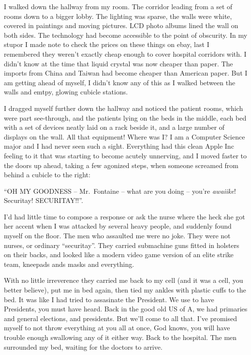 I walked down the hallway from my room. The corridor leading from a set of rooms down to a bigger lobby. The lighting was sparse, the walls were white, covered in paintings and moving pictures. LCD photo albums lined the wall on both sides. The technology had become accessible to the point of obscurity.
In my stupor I made note to check the prices on these things on ebay, last I remembered they weren't exactly cheap enough to cover hospital corridors with. I didn't know at the time that liquid crystal was now cheaper than paper. The imports from China and Taiwan had become cheaper than American paper. But I am getting ahead of myself, I didn't know any of this as I walked between the walls and emtpy, glowing cubicle stations.

I dragged myself further down the hallway and noticed the patient rooms, which were part see-through, and the patients lying on the beds in the middle, each bed with a set of devices neatly laid on a rack beside it, and a large number of displays on the wall. All that equipment! Where was I? I am a Computer Science major and I had never seen such a sight. Everything had this clean Apple Inc feeling to it that was starting to become acutely unnerving, and I moved faster to the doors up ahead, taking a few agonized steps, when someone screamed from behind a cubicle to the right:

``OH MY GOODNESS -- Mr.~Fontaine -- what are you doing -- you're \textit{awaiike}! Securitay! SECURITAY!!''.

I'd had little time to compose a response or ask the nurse where the heck she got her accent when I was attacked by several heavy people, and suddenly found myself on the floor. The men who assaulted me were no joke. They were not nurses, or ordinary ``securitay''. They carried submachine guns fitted in holsters on their backs, and looked like a modern video game version of an elite strike team, kneepads ands masks and everything.

With no little irreverence they carried me back to my cell (and it was a cell, you better believe), put me in bed again, then tied my ankles with plastic cuffs to the bed. It was like I had tried to assasinate the President. We use to have Presidents, you must have heard. Back in the good old US of A, we had primaries and general elections, and presidents. But we'll come to all that. I've promised myself to not throw everything at you all at once, God knows, you will have trouble enough swallowing any of it either way. Back to the hospital. The men surrounded my bed, waiting for the doctors to arrive.

